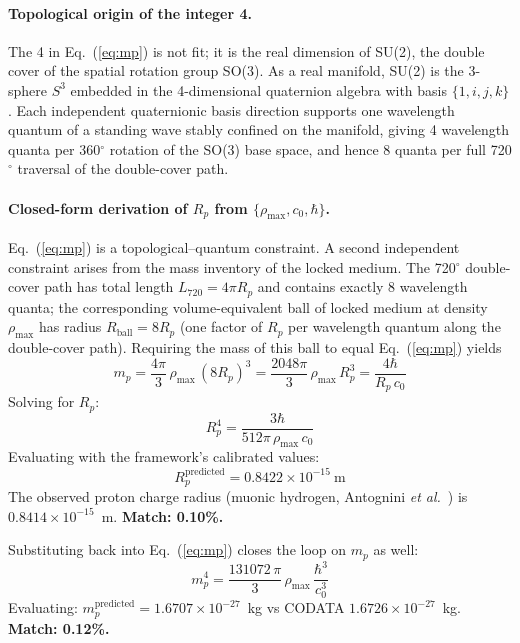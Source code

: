 \documentclass[aps,prd,twocolumn,superscriptaddress,amsmath,amssymb,nofootinbib,floatfix]{revtex4-2}
\newcommand{\rhomax}{\rho_{\max}}
\newcommand{\cnaught}{c_{0}}
\begin{document}
\paragraph*{Topological origin of the integer 4.}
The 4 in Eq.~(\ref{eq:mp}) is not fit; it is the real dimension of SU(2), the double cover of the spatial rotation group SO(3). As a real manifold, SU(2) is the 3-sphere $S^3$ embedded in the 4-dimensional quaternion algebra with basis $\{1, i, j, k\}$. Each independent quaternionic basis direction supports one wavelength quantum of a standing wave stably confined on the manifold, giving 4 wavelength quanta per 360$^{\circ}$ rotation of the SO(3) base space, and hence 8 quanta per full 720$^{\circ}$ traversal of the double-cover path.

\paragraph*{Closed-form derivation of $R_p$ from $\{\rhomax, \cnaught, \hbar\}$.}
Eq.~(\ref{eq:mp}) is a topological--quantum constraint. A second independent constraint arises from the mass inventory of the locked medium. The 720$^{\circ}$ double-cover path has total length $L_{720} = 4\pi R_p$ and contains exactly 8 wavelength quanta; the corresponding volume-equivalent ball of locked medium at density $\rhomax$ has radius $R_{\text{ball}} = 8 R_p$ (one factor of $R_p$ per wavelength quantum along the double-cover path). Requiring the mass of this ball to equal Eq.~(\ref{eq:mp}) yields
\begin{equation}
m_p = \frac{4\pi}{3}\,\rhomax\,(8 R_p)^3 = \frac{2048\pi}{3}\,\rhomax\,R_p^3 = \frac{4\hbar}{R_p\,\cnaught}
\end{equation}
Solving for $R_p$:
\begin{equation}
\boxed{R_p^4 = \frac{3\hbar}{512\pi\,\rhomax\,\cnaught}}
\label{eq:Rp}
\end{equation}
Evaluating with the framework's calibrated values:
\begin{equation}
R_p^{\text{predicted}} = 0.8422 \times 10^{-15}~\text{m}
\end{equation}
The observed proton charge radius (muonic hydrogen, Antognini \emph{et al.}~\cite{Antognini2013}) is $0.8414 \times 10^{-15}$~m. \textbf{Match: 0.10\%.}

Substituting back into Eq.~(\ref{eq:mp}) closes the loop on $m_p$ as well:
\begin{equation}
\boxed{m_p^4 = \frac{131072\,\pi}{3}\,\rhomax\,\frac{\hbar^3}{\cnaught^3}}
\label{eq:mp_closed}
\end{equation}
Evaluating: $m_p^{\text{predicted}} = 1.6707 \times 10^{-27}$~kg vs CODATA $1.6726 \times 10^{-27}$~kg. \textbf{Match: 0.12\%.}
\end{document}
